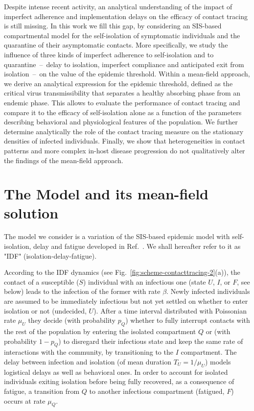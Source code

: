 \documentclass[aps,twocolumn,superscriptaddress,nofootinbib,pre,floatfix]{revtex4-1}
\begin{document}
Despite intense recent activity, an analytical understanding of the
impact of imperfect adherence and implementation delays on the
efficacy of contact tracing is still missing. In this work
we fill this gap, by considering an
SIS-based compartmental model for the self-isolation of symptomatic
individuals and the quarantine of their asymptomatic contacts. More
specifically, we study the influence of three kinds of imperfect
adherence to self-isolation and to quarantine~--~delay to isolation,
imperfect compliance and anticipated exit from isolation~--~on the value
of the epidemic threshold.
Within a mean-field approach, we derive an analytical expression
for the epidemic threshold, defined as the critical virus
transmissibility that separates a healthy absorbing phase from an
endemic phase. This allows to evaluate the performance of
contact tracing and compare it to the efficacy of self-isolation
alone as a function of the parameters describing behavioral and
physiological features of the population.
We further determine analytically the role of
the contact tracing measure on the stationary densities of infected
individuals.
Finally, we show that heterogeneities in contact patterns and
more complex in-host disease progression do not qualitatively
alter the findings of the mean-field approach.

\section{The Model and its mean-field solution}

The model we consider is a variation of the SIS-based epidemic model
with self-isolation, delay and fatigue developed in Ref.~\cite{QDF}. We
shall hereafter refer to it as "IDF" (isolation-delay-fatigue).

According to the IDF dynamics (see Fig.~\ref{fig:scheme-contacttracing-2}(a)),
the contact of a susceptible ($S$)
individual with an infectious one (state $U$, $I$, or $F$, see below)
leads to the infection of the former
with rate $\beta$. Newly infected individuals are assumed to be
immediately infectious but not yet settled on whether to enter
isolation or not (undecided, $U$). After a time interval distributed with
Poissonian rate $\mu_U$ they decide (with probability $p_Q$)
whether to fully interrupt contacts with the rest of the population by
entering the isolated compartment $Q$ or (with probability $1-p_Q$)
to disregard their infectious state
and keep the same rate of interactions with the community, by transitioning
to the $I$ compartment.
The delay between infection and isolation (of mean duration $T_U=1/\mu_U$)
models logistical delays as well as behavioral ones.
In order to account for isolated individuals exiting isolation
before being fully recovered, as a consequence of fatigue, 
a transition from $Q$ to another infectious compartment (fatigued, $F$) occurs
at rate $\mu_Q$.
\end{document}
